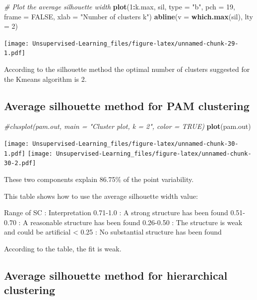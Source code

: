 \documentclass[
]{book}
\newenvironment{Shaded}{\begin{snugshade}}{\end{snugshade}}
\newcommand{\CommentTok}[1]{\textcolor[rgb]{0.56,0.35,0.01}{\textit{#1}}}
\newcommand{\DataTypeTok}[1]{\textcolor[rgb]{0.13,0.29,0.53}{#1}}
\newcommand{\DecValTok}[1]{\textcolor[rgb]{0.00,0.00,0.81}{#1}}
\newcommand{\KeywordTok}[1]{\textcolor[rgb]{0.13,0.29,0.53}{\textbf{#1}}}
\newcommand{\NormalTok}[1]{#1}
\newcommand{\OperatorTok}[1]{\textcolor[rgb]{0.81,0.36,0.00}{\textbf{#1}}}
\newcommand{\OtherTok}[1]{\textcolor[rgb]{0.56,0.35,0.01}{#1}}
\newcommand{\StringTok}[1]{\textcolor[rgb]{0.31,0.60,0.02}{#1}}
\begin{document}
\begin{Shaded}
\begin{Highlighting}[]
\CommentTok{# Plot the average silhouette width}
\KeywordTok{plot}\NormalTok{(}\DecValTok{1}\OperatorTok{:}\NormalTok{k.max, sil, }\DataTypeTok{type =} \StringTok{"b"}\NormalTok{, }\DataTypeTok{pch =} \DecValTok{19}\NormalTok{,}
\DataTypeTok{frame =} \OtherTok{FALSE}\NormalTok{, }\DataTypeTok{xlab =} \StringTok{"Number of clusters k"}\NormalTok{)}
\KeywordTok{abline}\NormalTok{(}\DataTypeTok{v =} \KeywordTok{which.max}\NormalTok{(sil), }\DataTypeTok{lty =} \DecValTok{2}\NormalTok{)}
\end{Highlighting}
\end{Shaded}

\texttt{[image: Unsupervised-Learning\_files/figure-latex/unnamed-chunk-29-1.pdf]}

According to the silhouette method the optimal number of clusters suggested for the Kmeans algorithm is 2.

\hypertarget{average-silhouette-method-for-pam-clustering}{%
\subsection{Average silhouette method for PAM clustering}\label{average-silhouette-method-for-pam-clustering}}

\begin{Shaded}
\begin{Highlighting}[]
\CommentTok{#clusplot(pam.out, main = "Cluster plot, k = 2", color = TRUE)}
\KeywordTok{plot}\NormalTok{(pam.out)}
\end{Highlighting}
\end{Shaded}

\texttt{[image: Unsupervised-Learning\_files/figure-latex/unnamed-chunk-30-1.pdf]} \texttt{[image: Unsupervised-Learning\_files/figure-latex/unnamed-chunk-30-2.pdf]}

These two components explain 86.75\% of the point variability.

This table shows how to use the average silhouette width value:

Range of SC : Interpretation
0.71-1.0 : A strong structure has been found
0.51-0.70 : A reasonable structure has been found
0.26-0.50 : The structure is weak and could be artificial
\textless{} 0.25 : No substantial structure has been found

According to the table, the fit is weak.

\hypertarget{average-silhouette-method-for-hierarchical-clustering}{%
\subsection{Average silhouette method for hierarchical clustering}\label{average-silhouette-method-for-hierarchical-clustering}}
\end{document}
